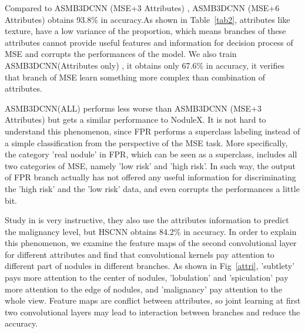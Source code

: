 \documentclass[runningheads]{llncs}
\begin{document}
Compared to  ASMB3DCNN (MSE+3  Attributes) ,  ASMB3DCNN (MSE+6  Attributes) obtains 93.8\% in accuracy.As shown in Table~\ref{tab2}, attributes like texture, have a low  variance of the proportion, which means branches of these attributes cannot provide useful features and information for decision process of MSE and corrupts the performances of the model.
We also train ASMB3DCNN(Attributes only) , it obtains only 67.6\%  in accuracy, it verifies that branch of MSE learn something more complex than combination of attributes.

 ASMB3DCNN(ALL)  performs less worse than ASMB3DCNN (MSE+3 Attributes) but gets a similar performance to NoduleX. It is not hard to understand this phenomenon, since FPR performs a superclass labeling instead of a simple classification from the perspective of the MSE task.  More specifically, the category 'real nodule' in FPR, which can be seen as a superclass, includes all two categories of MSE, namely 'low risk' and 'high risk'. In such way, the output of FPR branch actually has not offered any useful information for discriminating the 'high risk' and the 'low risk' data, and even corrupts the performances a little bit. 

Study in \cite{shen2019interpretable} is very instructive, they also use the attributes information to predict the malignancy level, but HSCNN obtains 84.2\% in accuracy. In order to explain this phenomenon, we examine  the feature maps of the second convolutional layer for different attributes and find that convolutional kernels pay attention to different part of nodules in different branches. As shown in Fig~\ref{attri}, 'subtlety' pays more attention to the center of nodules, 'lobulation' and 'spiculation' pay more attention to the edge of nodules, and 'malignancy' pay attention to the whole view. Feature maps are conflict between attributes, so joint learning at first two convolutional layers may lead to interaction between branches and reduce the accuracy.
\end{document}
